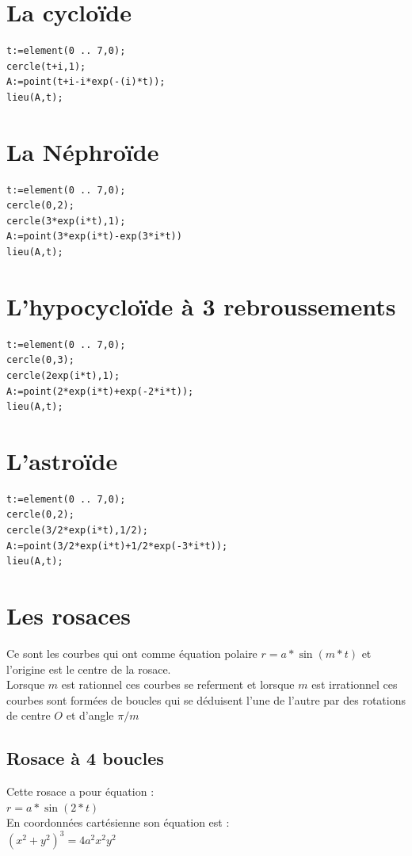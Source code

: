 \documentclass[a4paper,11pt]{book}
\begin{document}
\section{La cyclo\"ide}
\begin{verbatim}
t:=element(0 .. 7,0);
cercle(t+i,1);
A:=point(t+i-i*exp(-(i)*t));
lieu(A,t);
\end{verbatim}
\section{La N\'ephro\"ide}
\begin{verbatim}
t:=element(0 .. 7,0);
cercle(0,2);
cercle(3*exp(i*t),1);
A:=point(3*exp(i*t)-exp(3*i*t))
lieu(A,t);
\end{verbatim}
\section{L'hypocyclo\"ide \`a 3 rebroussements }
\begin{verbatim}
t:=element(0 .. 7,0);
cercle(0,3);
cercle(2exp(i*t),1);
A:=point(2*exp(i*t)+exp(-2*i*t));
lieu(A,t);
\end{verbatim}
\section{L'astro\"ide}
\begin{verbatim}
t:=element(0 .. 7,0);
cercle(0,2);
cercle(3/2*exp(i*t),1/2);
A:=point(3/2*exp(i*t)+1/2*exp(-3*i*t));
lieu(A,t);
\end{verbatim}

\section{Les rosaces}
Ce sont les courbes qui ont comme \'equation polaire $r=a*\sin(m*t)$ et 
l'origine est le centre de la rosace.\\
Lorsque $m$ est rationnel ces courbes se referment et lorsque $m$ est 
irrationnel ces courbes sont form\'ees de boucles qui se d\'eduisent l'une de l'autre par des rotations de centre $O$ et d'angle $\pi/m$ 

\subsection{Rosace \`a 4 boucles}
Cette rosace a pour \'equation :\\
$r=a*\sin(2*t)$\\
En coordonn\'ees cart\'esienne son \'equation est :\\
$(x^2+y^2)^3=4a^2x^2y^2$
\end{document}

